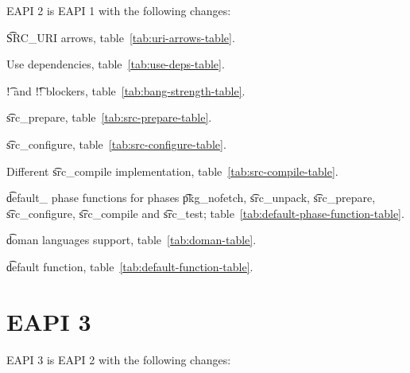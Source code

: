 EAPI 2 is EAPI 1 with the following changes:

\begin{compactitem}
\item \t{SRC\_URI} arrows, table~\ref{tab:uri-arrows-table}.
\item Use dependencies, table~\ref{tab:use-deps-table}.
\item \t{!} and \t{!!} blockers, table~\ref{tab:bang-strength-table}.
\item \t{src\_prepare}, table~\ref{tab:src-prepare-table}.
\item \t{src\_configure}, table~\ref{tab:src-configure-table}.
\item Different \t{src\_compile} implementation, table~\ref{tab:src-compile-table}.
\item \t{default\_} phase functions for phases \t{pkg\_nofetch}, \t{src\_unpack}, \t{src\_prepare},
    \t{src\_configure}, \t{src\_compile} and \t{src\_test}; table~\ref{tab:default-phase-function-table}.
\item \t{doman} languages support, table~\ref{tab:doman-table}.
\item \t{default} function, table~\ref{tab:default-function-table}.
\end{compactitem}

\section*{EAPI 3}

EAPI 3 is EAPI 2 with the following changes:


